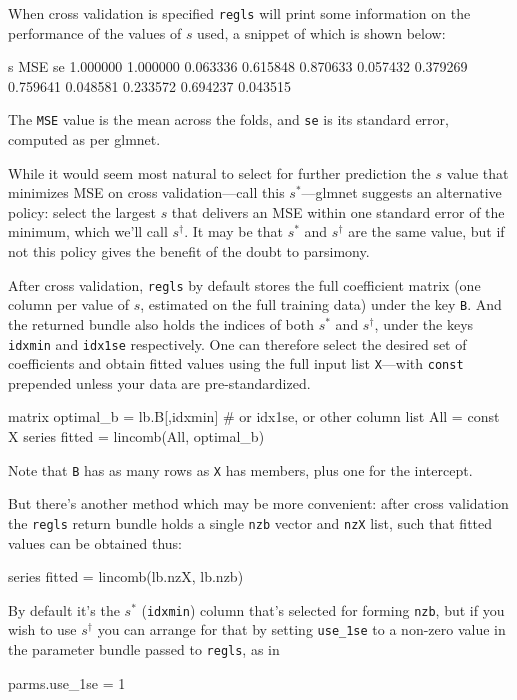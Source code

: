 \documentclass{article}
\begin{document}
When cross validation is specified \texttt{regls} will print some
information on the performance of the values of $s$ used, a
snippet of which is shown below:
\begin{code}
          s        MSE         se
   1.000000   1.000000   0.063336
   0.615848   0.870633   0.057432
   0.379269   0.759641   0.048581
   0.233572   0.694237   0.043515
\end{code}
The \texttt{MSE} value is the mean across the folds, and \texttt{se}
is its standard error, computed as per \textsf{glmnet}.

While it would seem most natural to select for further prediction the
$s$ value that minimizes MSE on cross validation---call this
$s^*$---\textsf{glmnet} suggests an alternative policy: select the
largest $s$ that delivers an MSE within one standard error of the
minimum, which we'll call $s^{\dagger}$. It may be that $s^*$ and
$s^{\dagger}$ are the same value, but if not this policy gives the
benefit of the doubt to parsimony.

After cross validation, \texttt{regls} by default stores the full
coefficient matrix (one column per value of $s$, estimated on the full
training data) under the key \texttt{B}.  And the returned bundle also
holds the indices of both $s^*$ and $s^{\dagger}$, under the keys
\texttt{idxmin} and \texttt{idx1se} respectively. One can therefore
select the desired set of coefficients and obtain fitted values using
the full input list \texttt{X}---with \texttt{const} prepended unless
your data are pre-standardized.
\begin{code}
matrix optimal_b = lb.B[,idxmin] # or idx1se, or other column
list All = const X
series fitted = lincomb(All, optimal_b)
\end{code}
Note that \texttt{B} has as many rows as \texttt{X} has members, plus
one for the intercept.

But there's another method which may be more convenient: after cross
validation the \texttt{regls} return bundle holds a single
\texttt{nzb} vector and \texttt{nzX} list, such that fitted values can
be obtained thus:
\begin{code}
series fitted = lincomb(lb.nzX, lb.nzb)
\end{code}
By default it's the $s^*$ (\texttt{idxmin}) column that's selected for
forming \texttt{nzb}, but if you wish to use $s^{\dagger}$ you can
arrange for that by setting \texttt{use\_1se} to a non-zero value in
the parameter bundle passed to \texttt{regls}, as in
\begin{code}
parms.use_1se = 1
\end{code}
\end{document}
